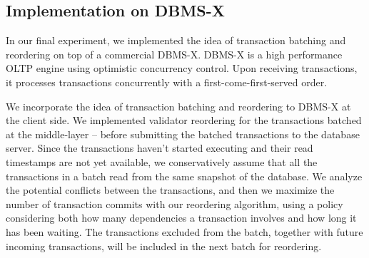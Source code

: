 

\subsection{Implementation on DBMS-X}
\label{subsec:experiment:compare}

In our final experiment, we implemented the idea of transaction batching and reordering on top of a commercial DBMS-X. DBMS-X is a high performance OLTP engine using optimistic concurrency control. Upon receiving transactions, it processes transactions concurrently with a first-come-first-served order.


We incorporate the idea of transaction batching and reordering to DBMS-X at the client side.
We implemented validator reordering for the transactions batched at the middle-layer -- before submitting the batched transactions to the database server. Since the transactions haven't started executing and their read timestamps are not yet available, we conservatively assume that all the transactions in a batch read from the same snapshot of the database. We analyze the potential conflicts between the transactions, and then we maximize the number of transaction commits with our reordering algorithm, using a policy considering both how many dependencies a transaction involves and how long it has been waiting. The transactions excluded from the batch, together with future incoming transactions, will be included in the next batch for reordering.


